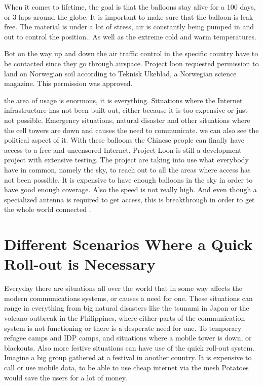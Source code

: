 When it comes to lifetime, the goal is that the balloons stay alive for a 100 days, or 3 laps around the globe. It is important to make sure that the balloon is leak free. The material is under a lot of stress, air is constantly being pumped in and out to control the position.. As well as the extreme cold and warm temperatures. 

Bot on the way up and down the air traffic control in the specific country have to be contacted since they go through airspace. Project loon requested permission to land on Norwegian soil according to Teknisk Ukeblad, a Norwegian science magazine. This permission was approved. \cite{loonTU}

the area of usage is enormous, it is everything. Situations where the Internet infrastructure has not been built out, either because it is too expensive or just not possible. Emergency situations, natural disaster and other situations where the cell towers are down and causes the need to communicate. we can also see the political aspect of it. With these balloons the Chinese people can finally have access to a free and uncensored Internet. Project Loon is still a development project with extensive testing. The project are taking into use what everybody have in common, namely the sky, to reach out to all the areas where access has not been possible. It is expensive to have enough balloons in the sky in order to have good enough coverage. Also the speed is not really high. And even though a specialized antenna is required to get access, this is breakthrough in order to get the whole world connected \cite{loonYouTube, loonNorsk}.
 
\section{Different Scenarios Where a Quick Roll-out is Necessary}

Everyday there are situations all over the world that in some way affects the modern communications systems, or causes a need for one. These situations can range in everything from big natural disasters like the tsunami in Japan or the volcano outbreak in the Philippines, where either parts of the communication system is not functioning or there is a desperate need for one. To temporary refugee camps and IDP camps, and situations where a mobile tower is down, or blackouts. Also more festive situations can have use of the quick roll-out system. Imagine a big group gathered at a festival in another country. It is expensive to call or use mobile data, to be able to use cheap internet via the mesh Potatoes would save the users for a lot of money. 


